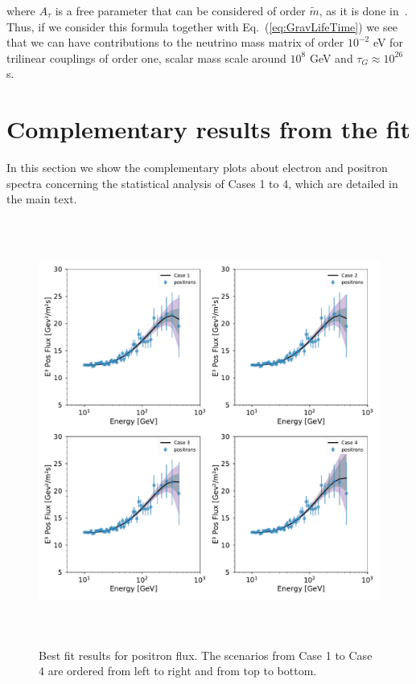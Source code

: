 \documentclass[a4paper,11pt]{article}
\begin{document}
\noindent where $A_{\tau}$ is a free parameter that can be considered
of order $\tilde{m}$, as it is done in~\cite{Chun:2004mu}. Thus, if we
consider this formula together with Eq.~(\ref{eq:GravLifeTime}) we
see that we can have contributions to the neutrino mass matrix of
order $10^{-2}$ eV for trilinear couplings of order one, scalar mass scale around $10^8$ GeV and $\tau_{G}\approx10^{26}$ s.

\section{Complementary results from the fit}

In this section we show the complementary plots about electron and positron spectra concerning the statistical analysis of Cases 1 to 4, which are detailed in the main text. 

\begin{figure}[!ht]
\begin{center}
\includegraphics[height=14cm,width=14cm,angle=0]{Figures/pymultinest_fit_case_5_positron_flux.pdf}
\caption{Best fit results for positron flux. The scenarios from Case 1 to Case 4 are ordered from left to right and from top to bottom.}
\label{fig:bf-positron-spectrum}
\end{center}
\end{figure}
\end{document}
